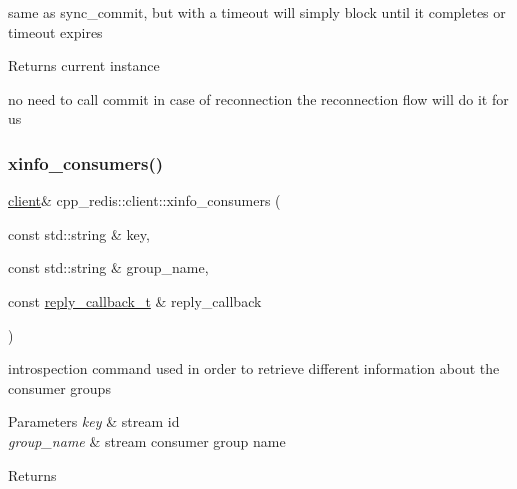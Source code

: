 same as sync\+\_\+commit, but with a timeout will simply block until it completes or timeout expires

\begin{DoxyReturn}{Returns}
current instance 
\end{DoxyReturn}
no need to call commit in case of reconnection the reconnection flow will do it for us \mbox{\label{classcpp__redis_1_1client_a972e59c216b86e38a1b77a4ca0bc6785}} 
\subsubsection{\texorpdfstring{xinfo\+\_\+consumers()}{xinfo\_consumers()}\hspace{0.1cm}{\footnotesize\ttfamily [1/2]}}
{\footnotesize\ttfamily \mbox{\hyperlink{classcpp__redis_1_1client}{client}}\& cpp\+\_\+redis\+::client\+::xinfo\+\_\+consumers (\begin{DoxyParamCaption}\item[{const std\+::string \&}]{key,  }\item[{const std\+::string \&}]{group\+\_\+name,  }\item[{const \mbox{\hyperlink{classcpp__redis_1_1client_af7a65eb21aa25230bfbb0b0203c4fc04}{reply\+\_\+callback\+\_\+t}} \&}]{reply\+\_\+callback }\end{DoxyParamCaption})}



introspection command used in order to retrieve different information about the consumer groups 


\begin{DoxyParams}{Parameters}
{\em key} & stream id \\
\hline
{\em group\+\_\+name} & stream consumer group name \\
\hline
\end{DoxyParams}
\begin{DoxyReturn}{Returns}

\end{DoxyReturn}
\mbox{\label{classcpp__redis_1_1client_a6497165de42557c953189305a0f22542}} 
